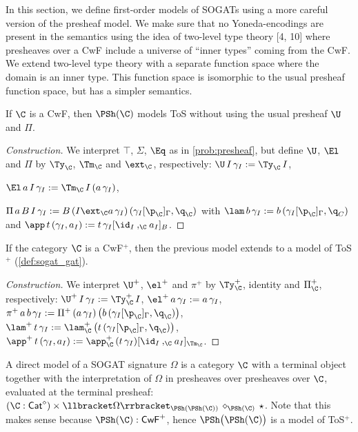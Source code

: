 In this section, we define first-order models of SOGATs using a more
careful version of the presheaf model. We make sure that no
Yoneda-encodings are present in the semantics using the idea of
two-level type theory
[4, 10]
where presheaves over a CwF include a universe of ``inner types''
coming from the CwF. We extend two-level type theory with a separate function space
where the domain is an inner type. This function space is isomorphic
to the usual presheaf function space, but has a simpler semantics.
\begin{problem}\label{prob:psh_gat}
  If $\C$ is a CwF, then $\PSh(\C)$ models ToS without using the usual
  presheaf $\U$ and $\Pi$.
\end{problem}
\begin{proof}[Construction]
  We interpret $\top$, $\Sigma$, $\Eq$ as in \autoref{prob:presheaf},
  but define $\U$, $\El$ and $\Pi$ by $\Ty_\C$, $\Tm_\C$ and
  $\ext_\C$, respectively: $\U\,I\,\gamma_I := \Ty_\C\,I$,
  
  $\El\,a\,I\,\gamma_I := \Tm_\C\,I\,(a\,\gamma_I)$,
  
  $\Pi\,a\,B\,I\,\gamma_I := B\,(I\ext_\C a\,\gamma_I)\,(\gamma_I[\p_\C]_\Gamma,\q_\C)$ with
  $\lam\,b\,\gamma_I := b\,(\gamma_I[\p_\C]_\Gamma,\q_C)$ and
  $\app\,t\,(\gamma_I,a_I) := t\,\gamma_I[\id_I\mathbin{,_\C}a_I]_B$.
\end{proof}
\begin{problem}
  If the category $\C$ is a CwF$^+$, then the previous model extends
  to a model of ToS$^+$ (\autoref{def:sogat_gat}).
\end{problem}
\begin{proof}[Construction]
  We interpret $\U^+$, $\el^+$ and $\pi^+$ by $\Ty^+_\C$, identity and
  $\Pi^+_\C$, respectively: $\U^+\,I\,\gamma_I := \Ty^+_\C\,I$,
  $\el^+\,a\,\gamma_I := a\,\gamma_I$, $\pi^+\,a\,b\,\gamma_I :=
  \Pi^+\,(a\,\gamma_I)\,\big(b\,(\gamma_I[\p_\C]_\Gamma,\q_\C)\big)$,
  $\lam^+\,t\,\gamma_I :=
  \lam^+_\C\,\big(t\,(\gamma_I[\p_\C]_\Gamma,\q_\C)\big)$,
  $\app^+\,t\,(\gamma_I,a_I) :=
  \app^+_\C\,(t\,\gamma_I)[\id_I\mathbin{,_\C}a_I]_{\Tm_\C}$.
\end{proof}
\begin{definition}\label{def:direct}
  A direct model of a SOGAT signature $\Omega$ is a category $\C$ with a
  terminal object together with the interpretation of $\Omega$ in
  presheaves over presheaves over $\C$, evaluated at the terminal
  presheaf: $(\C:\mathsf{Cat}^\diamond) \times
  \llbracket\Omega\rrbracket_{\PSh(\PSh(\C))}\,\diamond_{\PSh(\C)}\,{\star}$. Note
  that this makes sense because
  $\PSh(\C):\mathsf{CwF}^+$, hence $\PSh\big(\PSh(\C)\big)$ is a model
  of ToS$^+$.
\end{definition}
